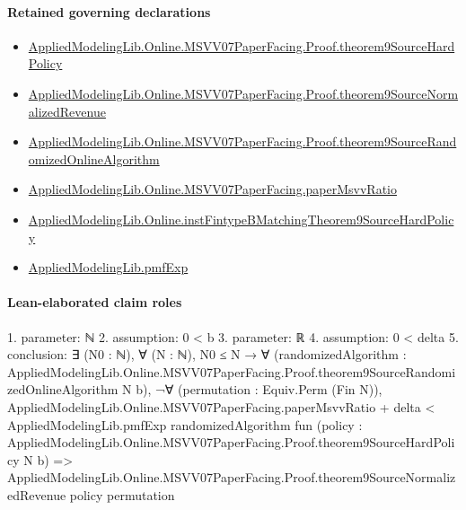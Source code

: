 \documentclass[10pt]{article}
\begin{document}
\paragraph{Retained governing declarations}
\begin{itemize}\raggedright
\item \hyperlink{governing-declaration-a896f9d280df5358}{Applied\allowbreak{}Modeling\allowbreak{}Lib.\allowbreak{}Online.\allowbreak{}MSVV07\allowbreak{}Paper\allowbreak{}Facing.\allowbreak{}Proof.\allowbreak{}theorem9\allowbreak{}Source\allowbreak{}Hard\allowbreak{}Policy}
\item \hyperlink{governing-declaration-0e91040dfed94ef3}{Applied\allowbreak{}Modeling\allowbreak{}Lib.\allowbreak{}Online.\allowbreak{}MSVV07\allowbreak{}Paper\allowbreak{}Facing.\allowbreak{}Proof.\allowbreak{}theorem9\allowbreak{}Source\allowbreak{}Normalized\allowbreak{}Revenue}
\item \hyperlink{governing-declaration-ef01a6bdb7676af9}{Applied\allowbreak{}Modeling\allowbreak{}Lib.\allowbreak{}Online.\allowbreak{}MSVV07\allowbreak{}Paper\allowbreak{}Facing.\allowbreak{}Proof.\allowbreak{}theorem9\allowbreak{}Source\allowbreak{}Randomized\allowbreak{}Online\allowbreak{}Algorithm}
\item \hyperlink{governing-declaration-11865634591d1a39}{Applied\allowbreak{}Modeling\allowbreak{}Lib.\allowbreak{}Online.\allowbreak{}MSVV07\allowbreak{}Paper\allowbreak{}Facing.\allowbreak{}paper\allowbreak{}Msvv\allowbreak{}Ratio}
\item \hyperlink{governing-declaration-538bf5ade68adc3d}{Applied\allowbreak{}Modeling\allowbreak{}Lib.\allowbreak{}Online.\allowbreak{}inst\allowbreak{}Fintype\allowbreak{}B\allowbreak{}Matching\allowbreak{}Theorem9\allowbreak{}Source\allowbreak{}Hard\allowbreak{}Policy}
\item \hyperlink{governing-declaration-8e4b4389a4f6454b}{Applied\allowbreak{}Modeling\allowbreak{}Lib.\allowbreak{}pmf\allowbreak{}Exp}
\end{itemize}
\paragraph{Lean-elaborated claim roles}\begin{ReviewVerbatim}
1. parameter: ℕ
2. assumption: 0 < b
3. parameter: ℝ
4. assumption: 0 < delta
5. conclusion: ∃ (N0 : ℕ),
  ∀ (N : ℕ),
    N0 ≤ N →
      ∀
        (randomizedAlgorithm :
          AppliedModelingLib.Online.MSVV07PaperFacing.Proof.theorem9SourceRandomizedOnlineAlgorithm N b),
        ¬∀ (permutation : Equiv.Perm (Fin N)),
            AppliedModelingLib.Online.MSVV07PaperFacing.paperMsvvRatio + delta <
              AppliedModelingLib.pmfExp randomizedAlgorithm
                fun (policy : AppliedModelingLib.Online.MSVV07PaperFacing.Proof.theorem9SourceHardPolicy N b) =>
                AppliedModelingLib.Online.MSVV07PaperFacing.Proof.theorem9SourceNormalizedRevenue policy permutation
\end{ReviewVerbatim}
\end{document}
